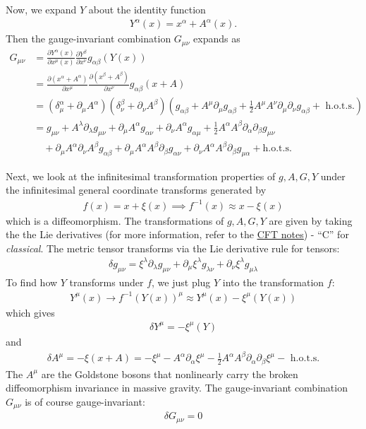 \documentclass{book}
\theoremstyle{definition}
\newcommand{\p}{\partial}
\newcommand{\nn}{\nonumber}
\newcommand{\al}{\alpha}
\newcommand{\be}{\beta}
\newcommand{\f}[2]{\frac{#1}{#2}}
\newcommand{\lp}{\left(}
\newcommand{\rp}{\right)}
\begin{document}
Now, we expand $Y$ about the identity function
\begin{align}
Y^\al(x) = x^\al + A^\al(x).
\end{align}
Then the gauge-invariant combination $G_{\mu\nu}$ expands as
\begin{align}\label{xpand}
G_{\mu\nu} &= \f{\p Y^\al(x)}{\p x^\mu(x)} \f{\p Y^\be}{\p x^\nu} g_{\al\be}(Y(x))\nn\\
&= \f{\p (x^\al + A^\al)}{\p x^\mu} \f{\p(x^\be + A^\be)}{\p x^\nu} g_{\al\be}(x+A)\nn\\
&= (\delta^\al_\mu + \p_\mu A^\al)(\delta^\be_\nu + \p_\nu A^\be)\lp g_{\al\be} + A^\mu \p_\mu g_{\al\be} + \f{1}{2}A^\mu A^\nu \p_\mu \p_\nu g_{\al\be} +  \text{ h.o.t.s.} \rp\nn\\
&= g_{\mu\nu} + A^\lambda \p_\lambda g_{\mu\nu} + \p_\mu A^\al g_{\al\nu} + \p_\nu A^\al g_{\al\mu} + \f{1}{2} A^\al A^\be \p_\al\p_\be g_{\mu\nu}\nn\\
&\quad  + \p_\mu A^\al \p_\nu A^\beta g_{\al\be} + \p_\mu A^\al A^\be \p_\be g_{\al\nu} + \p_\nu A^\al A^\be \p_\be g_{\mu\al} + \text{h.o.t.s.}
\end{align}

Next, we look at the infinitesimal transformation properties of $g,A,G,Y$ under the infinitesimal general coordinate transforms generated by
\begin{align}
f(x) = x + \xi(x) \implies f^{-1}(x) \approx x - \xi(x)
\end{align}
which is a diffeomorphism. The transformations of $g,A,G,Y$ are given by taking the the Lie derivatives (for more information, refer to the \href{https://huanqbui.com/LaTeX projects/Classical_Fields_Theory/HuanBui_ClassicalFieldTheory.pdf}{\underline{CFT notes}}) - ``C'' for \textit{classical}. The metric tensor transforms via the Lie derivative rule for tensors:
\begin{align}
\boxed{\delta g_{\mu\nu} = \xi^\lambda \p_\lambda g_{\mu\nu} + \p_\mu \xi^\lambda g_{\lambda\nu} + \p_\nu \xi^\lambda g_{\mu\lambda}}
\end{align}
To find how $Y$ transforms under $f$, we just plug $Y$ into the transformation $f$:
\begin{align}
Y^\mu(x) \to f^{-1}(Y(x))^\mu \approx  Y^\mu(x) - \xi^\mu (Y(x))
\end{align}
which gives
\begin{align}
\boxed{\delta Y^\mu = -\xi^\mu (Y)}
\end{align}
and
\begin{align}
\boxed{\delta A^\mu = -\xi(x+A) = -\xi^\mu - A^\al \p_\al \xi^\mu - \f{1}{2}A^\al A^\be \p_\al\p_\be \xi^\mu - \text{ h.o.t.s.}}
\end{align}
The $A^\mu$ are the Goldstone bosons that nonlinearly carry the broken diffeomorphism invariance in massive gravity. The gauge-invariant combination $G_{\mu\nu}$ is of course gauge-invariant:
\begin{align}
\boxed{\delta G_{\mu\nu} = 0} 
\end{align}
\end{document}

